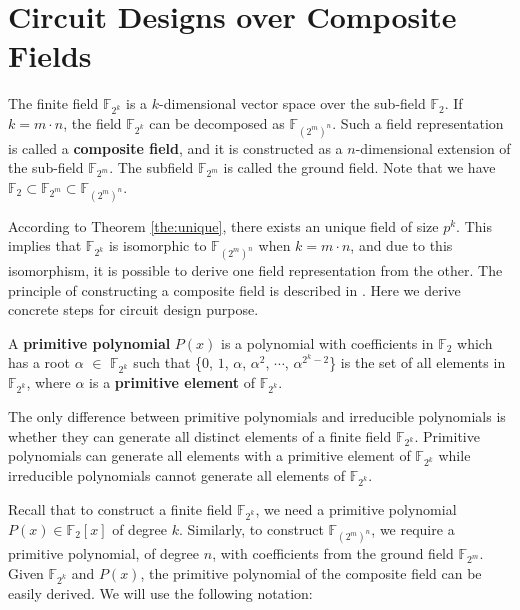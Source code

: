 \section{Circuit Designs over Composite Fields}
The finite field $\mathbb{F}_{2^k}$ is a $k$-dimensional vector space over the
sub-field $\mathbb{F}_2$. If $k = m\cdot n$, the field $\mathbb{F}_{2^k}$
can be decomposed as $\mathbb{F}_{(2^m)^n}$. Such a field representation is
called a {\bf composite field}, and it is constructed as a $n$-dimensional 
extension of the sub-field $\mathbb{F}_{2^m}$. The subfield $\mathbb{F}_{2^m}$ is
called the ground field. Note that we have $\mathbb{F}_2 \subset \mathbb{F}_{2^m}
\subset \mathbb{F}_{(2^m)^n}$.  

According to Theorem \ref{the:unique}, there exists an unique field of size $p^{k}$. 
This implies that $\mathbb{F}_{2^k}$ is isomorphic to
$\mathbb{F}_{(2^m)^n}$ when $k = m\cdot n$,  and due to this isomorphism,
it is possible to derive one field representation from the other. 
The principle of constructing a composite field is described in \cite{phdpaar:1994}. 
Here we derive concrete steps for circuit design purpose.


\begin{Definition}
A {\bf primitive polynomial} $P(x)$ is a polynomial with coefficients in $\mathbb{F}_2$ which has a root $\alpha$ $\in$ $\mathbb{F}_{2^k}$
such that \{$0$, $1$, $\alpha$, $\alpha^2$, $\cdots$, $\alpha^{2^k-2}$\} is the set of all elements in $\mathbb{F}_{2^k}$, 
where $\alpha$ is a {\bf primitive element} of $\mathbb{F}_{2^k}$. 
\end{Definition}

The only difference between primitive polynomials and irreducible polynomials is whether they can generate all distinct elements 
of a finite field $\mathbb{F}_{2^k}$.
Primitive polynomials can generate all elements with a primitive element of $\mathbb{F}_{2^k}$ while irreducible polynomials 
cannot generate all elements of $\mathbb{F}_{2^k}$.

Recall that to construct a finite field $\mathbb{F}_{2^k}$, we need a primitive
polynomial $P(x) \in \mathbb{F}_2[x]$ of degree $k$. Similarly, to construct
$\mathbb{F}_{(2^m)^n}$, we require a primitive polynomial, of degree $n$, with
coefficients from the ground field $\mathbb{F}_{2^m}$. Given $\mathbb{F}_{2^k}$ and
$P(x)$, the primitive polynomial of the composite field can be easily
derived. We will use the following notation:

